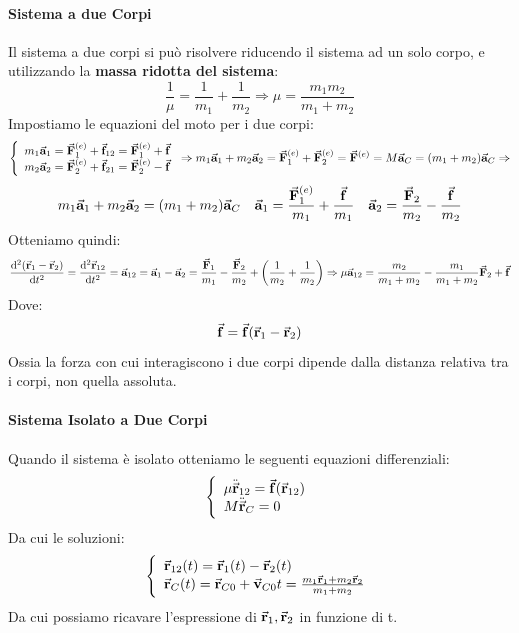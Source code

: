 \documentclass{article}
\newcommand{\then}{\ensuremath{\Rightarrow}}
\renewcommand{\a}{\va{a}}
\renewcommand{\v}{\va{v}}
\renewcommand{\r}{\va{r}}
\newcommand{\F}{\va{F}}
\newcommand{\f}{\va{f}}
\begin{document}
\paragraph{Sistema a due Corpi}
Il sistema a due corpi si può risolvere riducendo il sistema ad un solo corpo, e utilizzando la \textbf{massa ridotta del sistema}:
\begin{equation}
    \frac{1}{\mu}=\frac{1}{m_1}+\frac{1}{m_2}\then\boxed{\mu=\frac{m_1m_2}{m_1+m_2}}
\end{equation}
Impostiamo le equazioni del moto per i due corpi:
\begin{equation}
\left\{\begin{array}{l}
    m_1\a_1=\F_1^{(e)}+\f_{12}=\F_1^{(e)}+\f  \\
    m_2\a_2=\F_2^{(e)}+\f_{21}=\F_2^{(e)}-\f 
\end{array}\right.\then m_1\a_1+m_2\a_2=\F_1^{(e)}+\F_2^{(e)}=\F^{(e)}=M\a_C=(m_1+m_2)\a_C\then
\end{equation}
\begin{equation}
    m_1\a_1+m_2\a_2=(m_1+m_2)\a_C\quad \a_1=\frac{\F_1^{(e)}}{m_1}+\frac{\f}{m_1}\quad \a_2=\frac{\F_2}{m_2}-\frac{\f}{m_2}
\end{equation}
Otteniamo quindi:
\begin{equation}
    \dv[2]{(\r_1-\r_2)}{t}=\dv[2]{\r_{12}}{t}=\a_{12}=\a_1-\a_2=\frac{\F_1}{m_1}-\frac{\F_2}{m_2}+\left(\frac{1}{m_2}+\frac{1}{m_2}\right)\then \mu\a_{12}=\frac{m_2}{m_1+m_2}-\frac{m_1}{m_1+m_2}\F_2+\f 
\end{equation}
Dove: \[\f=\f(\r_1-\r_2)\]
Ossia la forza con cui interagiscono i due corpi dipende dalla distanza relativa tra i corpi, non quella assoluta. 
\paragraph{Sistema Isolato a Due Corpi}
Quando il sistema è isolato otteniamo le seguenti equazioni differenziali:
\begin{equation}
\left\{\begin{array}{l}
    \mu\ddot{\r}_{12}=\f(\r_{12}) \\
    M\ddot{\r}_C=0
\end{array}
\right.
\end{equation}
Da cui le soluzioni:
\begin{equation}
\left\{\begin{array}{l}
    \r_{12}(t)=\r_1(t)-\r_2(t)  \\
     \r_C(t)=\r_{C0}+\v_{C0}t=\frac{m_1\r_1+m_2\r_2}{m_1+m_2} 
\end{array}\right.
\end{equation}
Da cui possiamo ricavare l'espressione di $\r_1,\r_2$ in funzione di t.
\end{document}
